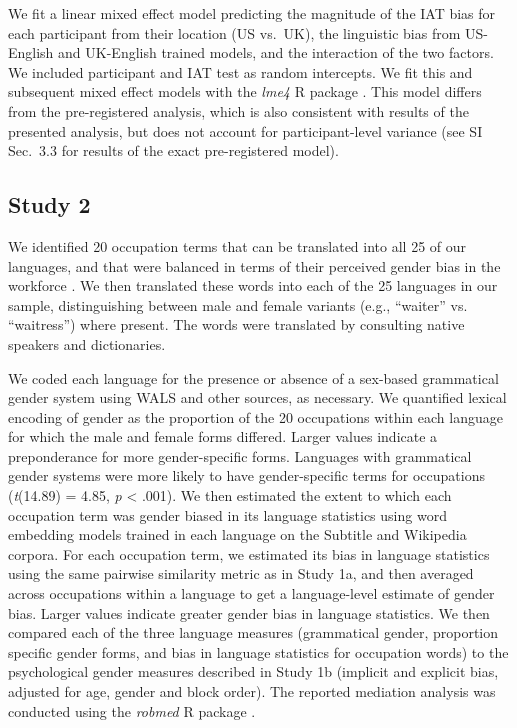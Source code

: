 \documentclass[9pt,twocolumn,twoside,lineno]{pnas-new}
\begin{document}
{We fit a linear mixed effect model predicting the magnitude of the IAT bias for each participant from their location (US vs.\ UK), the linguistic bias from US-English and UK-English trained models, and the interaction of the two factors. We included participant and IAT test as random intercepts. We fit this and subsequent mixed effect models with the \emph{lme4} R package \cite{lme4package}. This model differs from the pre-registered analysis, which is also consistent with results of the presented analysis, but does not account for participant-level variance (see SI Sec.\ 3.3 for results of the exact pre-registered model).


\subsection*{Study 2}

We identified 20 occupation terms that can be translated into  all 25 of our languages, and that were balanced in terms of their perceived gender bias in the workforce \cite{misersky2014norms}. We
then translated these words into each of the 25 languages in our sample,
distinguishing between male and female variants (e.g., \enquote{waiter}
vs. \enquote{waitress}) where present. The words were translated by
consulting native speakers and dictionaries.

We coded each language for the presence or absence of a sex-based grammatical gender system using WALS \cite{wals} and other sources, as necessary. We quantified lexical encoding of gender as the proportion of the 20 occupations within each language for which the male and female forms differed. Larger values indicate a preponderance for more gender-specific forms.  Languages with grammatical gender systems were more likely to have gender-specific terms for occupations
(\emph{t}(14.89) = 4.85, \emph{p} \textless{} .001). We then estimated the extent to which each occupation term was gender biased in its language statistics using word
embedding models trained in each language on the Subtitle and Wikipedia
corpora. For each occupation term, we estimated its bias in language
statistics using the same pairwise similarity metric as in Study 1a, and
then averaged across occupations within a language to get a
language-level estimate of gender bias. Larger values indicate greater
gender bias in language statistics. We then compared each of the three
language measures (grammatical gender, proportion specific gender forms,
and bias in language statistics for occupation words) to the
psychological gender measures described in Study 1b (implicit and
explicit bias, adjusted for age, gender and block order). The reported mediation analysis was conducted using the \emph{robmed} R package \cite{robmed}.

}

\showmatmethods{} %

\showacknow{} %


\end{document}
